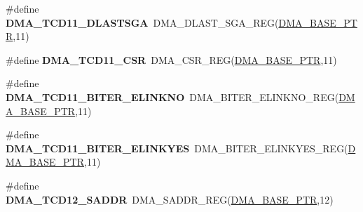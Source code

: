 \begin{DoxyCompactItemize}
\item 
\hypertarget{group___d_m_a___register___accessor___macros_ga0232d39a5ab4dc292b79d1980ebdce51}{}\#define {\bfseries D\+M\+A\+\_\+\+T\+C\+D11\+\_\+\+D\+L\+A\+S\+T\+S\+G\+A}~D\+M\+A\+\_\+\+D\+L\+A\+S\+T\+\_\+\+S\+G\+A\+\_\+\+R\+E\+G(\hyperlink{group___d_m_a___peripheral_ga6997fbc1b1973e9f27170217a3bd6f22}{D\+M\+A\+\_\+\+B\+A\+S\+E\+\_\+\+P\+T\+R},11)\label{group___d_m_a___register___accessor___macros_ga0232d39a5ab4dc292b79d1980ebdce51}

\item 
\hypertarget{group___d_m_a___register___accessor___macros_ga2d9870d440cbc2d16186f84221454768}{}\#define {\bfseries D\+M\+A\+\_\+\+T\+C\+D11\+\_\+\+C\+S\+R}~D\+M\+A\+\_\+\+C\+S\+R\+\_\+\+R\+E\+G(\hyperlink{group___d_m_a___peripheral_ga6997fbc1b1973e9f27170217a3bd6f22}{D\+M\+A\+\_\+\+B\+A\+S\+E\+\_\+\+P\+T\+R},11)\label{group___d_m_a___register___accessor___macros_ga2d9870d440cbc2d16186f84221454768}

\item 
\hypertarget{group___d_m_a___register___accessor___macros_ga3663df77de1b0291986ce936d00049e4}{}\#define {\bfseries D\+M\+A\+\_\+\+T\+C\+D11\+\_\+\+B\+I\+T\+E\+R\+\_\+\+E\+L\+I\+N\+K\+N\+O}~D\+M\+A\+\_\+\+B\+I\+T\+E\+R\+\_\+\+E\+L\+I\+N\+K\+N\+O\+\_\+\+R\+E\+G(\hyperlink{group___d_m_a___peripheral_ga6997fbc1b1973e9f27170217a3bd6f22}{D\+M\+A\+\_\+\+B\+A\+S\+E\+\_\+\+P\+T\+R},11)\label{group___d_m_a___register___accessor___macros_ga3663df77de1b0291986ce936d00049e4}

\item 
\hypertarget{group___d_m_a___register___accessor___macros_ga42aed10d8bc9213b5bc04050566cb6dc}{}\#define {\bfseries D\+M\+A\+\_\+\+T\+C\+D11\+\_\+\+B\+I\+T\+E\+R\+\_\+\+E\+L\+I\+N\+K\+Y\+E\+S}~D\+M\+A\+\_\+\+B\+I\+T\+E\+R\+\_\+\+E\+L\+I\+N\+K\+Y\+E\+S\+\_\+\+R\+E\+G(\hyperlink{group___d_m_a___peripheral_ga6997fbc1b1973e9f27170217a3bd6f22}{D\+M\+A\+\_\+\+B\+A\+S\+E\+\_\+\+P\+T\+R},11)\label{group___d_m_a___register___accessor___macros_ga42aed10d8bc9213b5bc04050566cb6dc}

\item 
\hypertarget{group___d_m_a___register___accessor___macros_ga4dd8efb3586fceb233373ef3d8ed7eed}{}\#define {\bfseries D\+M\+A\+\_\+\+T\+C\+D12\+\_\+\+S\+A\+D\+D\+R}~D\+M\+A\+\_\+\+S\+A\+D\+D\+R\+\_\+\+R\+E\+G(\hyperlink{group___d_m_a___peripheral_ga6997fbc1b1973e9f27170217a3bd6f22}{D\+M\+A\+\_\+\+B\+A\+S\+E\+\_\+\+P\+T\+R},12)\label{group___d_m_a___register___accessor___macros_ga4dd8efb3586fceb233373ef3d8ed7eed}


\end{DoxyCompactItemize}
